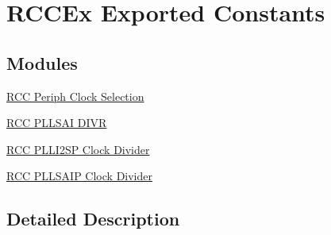 \hypertarget{group___r_c_c_ex___exported___constants}{}\section{R\+C\+C\+Ex Exported Constants}
\label{group___r_c_c_ex___exported___constants}
\subsection*{Modules}
\begin{DoxyCompactItemize}
\item 
\hyperlink{group___r_c_c_ex___periph___clock___selection}{R\+C\+C Periph Clock Selection}
\item 
\hyperlink{group___r_c_c_ex___p_l_l_s_a_i___d_i_v_r}{R\+C\+C P\+L\+L\+S\+A\+I D\+I\+VR}
\item 
\hyperlink{group___r_c_c_ex___p_l_l_i2_s_p___clock___divider}{R\+C\+C P\+L\+L\+I2\+S\+P Clock Divider}
\item 
\hyperlink{group___r_c_c_ex___p_l_l_s_a_i_p___clock___divider}{R\+C\+C P\+L\+L\+S\+A\+I\+P Clock Divider}
\end{DoxyCompactItemize}


\subsection{Detailed Description}
